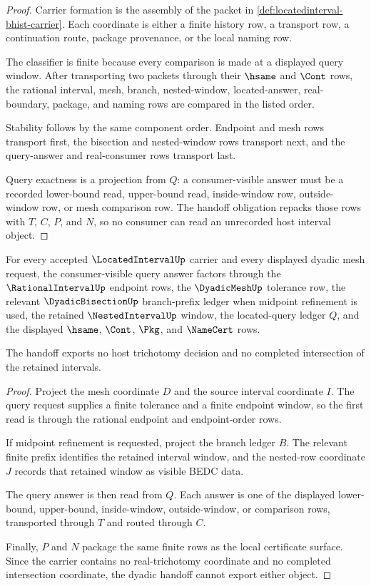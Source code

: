 \begin{proof}
Carrier formation is the assembly of the packet in \autoref{def:locatedinterval-bhist-carrier}. Each coordinate is either a finite history row, a transport row, a continuation route, package provenance, or the local naming row.

The classifier is finite because every comparison is made at a displayed query window. After transporting two packets through their $\hsame$ and $\Cont$ rows, the rational interval, mesh, branch, nested-window, located-answer, real-boundary, package, and naming rows are compared in the listed order.

Stability follows by the same component order. Endpoint and mesh rows transport first, the bisection and nested-window rows transport next, and the query-answer and real-consumer rows transport last.

Query exactness is a projection from $Q$: a consumer-visible answer must be a recorded lower-bound read, upper-bound read, inside-window row, outside-window row, or mesh comparison row. The handoff obligation repacks those rows with $T$, $C$, $P$, and $N$, so no consumer can read an unrecorded host interval object.
\end{proof}

\begin{theorem}
\label{thm:locatedinterval-dyadic-query-handoff}
For every accepted $\LocatedIntervalUp$ carrier and every displayed dyadic mesh request, the consumer-visible query answer factors through the $\RationalIntervalUp$ endpoint rows, the $\DyadicMeshUp$ tolerance row, the relevant $\DyadicBisectionUp$ branch-prefix ledger when midpoint refinement is used, the retained $\NestedIntervalUp$ window, the located-query ledger $Q$, and the displayed $\hsame$, $\Cont$, $\Pkg$, and $\NameCert$ rows.

The handoff exports no host trichotomy decision and no completed intersection of the retained intervals.
\end{theorem}
\begin{proof}
Project the mesh coordinate $D$ and the source interval coordinate $I$. The query request supplies a finite tolerance and a finite endpoint window, so the first read is through the rational endpoint and endpoint-order rows.

If midpoint refinement is requested, project the branch ledger $B$. The relevant finite prefix identifies the retained interval window, and the nested-row coordinate $J$ records that retained window as visible BEDC data.

The query answer is then read from $Q$. Each answer is one of the displayed lower-bound, upper-bound, inside-window, outside-window, or comparison rows, transported through $T$ and routed through $C$.

Finally, $P$ and $N$ package the same finite rows as the local certificate surface. Since the carrier contains no real-trichotomy coordinate and no completed intersection coordinate, the dyadic handoff cannot export either object.
\end{proof}

